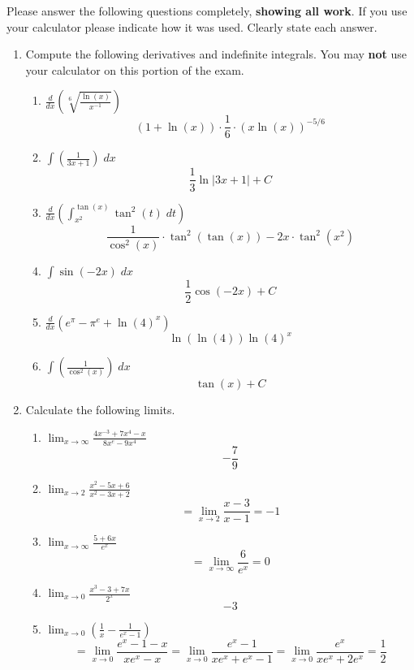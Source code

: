 \documentclass[11pt]{article}
\newcommand{\ds}{\displaystyle}
\begin{document}
\drawtitle

\noindent Please answer the following questions completely,
\textbf{showing all work}.  If you use your calculator please indicate
how it was used.  Clearly state each answer.

\begin{enumerate}
\item Compute the following derivatives and indefinite integrals.  You
  may \textbf{not} use your calculator on this portion of the exam.
  \begin{enumerate}
  \item $\ds\frac{d}{dx}\left(\sqrt[6]{\frac{\ln(x)}{x^{-1}}}\right)$
    \vfill
    \[
    (1+\ln(x))\cdot\frac{1}{6}\cdot (x\ln(x))^{-5/6}
    \]
    \vfill
  \item $\ds\int\left(\frac{1}{3x+1}\right)\;dx$
    \vfill
    \[
    \frac{1}{3}\ln|3x+1|+C
    \]
    \vfill
    \newpage
  \item $\ds\frac{d}{dx}\left(\int_{x^2}^{\tan(x)}\tan^2(t)\;dt\right)$
    \vfill
    \[
    \frac{1}{\cos^2(x)}\cdot\tan^2(\tan(x))-2x\cdot\tan^2(x^2)
    \]
    \vfill
  \item $\ds\int\sin\left(-2x\right)\;dx$
    \vfill
    \[
    \frac{1}{2}\cos(-2x)+C
    \]
    \vfill
    \newpage
  \item $\ds\frac{d}{dx}\left(e^{\pi}-\pi^e+\ln(4)^x\right)$
    \vfill
    \[
    \ln(\ln(4))\ln(4)^x
    \]
    \vfill
  \item $\ds\int\left(\frac{1}{\cos^2(x)}\right)\;dx$
    \vfill
    \[
    \tan(x)+C
    \]
    \vfill
  \end{enumerate}

  \newpage

\item Calculate the following limits.
  \begin{enumerate}
  \item $\ds\lim_{x\to \infty}\frac{4x^{-3}+7x^4-x}{8x^e-9x^4}$
    \vfill
    \[
    -\frac{7}{9}
    \]
    \vfill
  \item $\ds\lim_{x\to 2}\frac{x^2-5x+6}{x^2-3x+2}$
    \vfill
    \[
    =\lim_{x\to 2}\frac{x-3}{x-1}=-1
    \]
    \vfill
  \item $\ds\lim_{x\to \infty}\frac{5+6x}{e^x}$
    \vfill
    \[
    =\lim_{x\to\infty} \frac{6}{e^x}=0
    \]
    \vfill\newpage
  \item $\ds\lim_{x\to 0}\frac{x^3-3+7x}{2^x}$
    \vfill
    \[
    -3
    \]
    \vfill
  \item $\ds\lim_{x\to 0}\left(\frac{1}{x}-\frac{1}{e^x-1}\right)$
    \vfill
    \[
    =\lim_{x\to 0}\frac{e^x-1-x}{xe^x-x} =\lim_{x\to
      0}\frac{e^x-1}{xe^x+e^x-1} =\lim_{x\to
      0}\frac{e^x}{xe^x+2e^x}=\frac{1}{2}
    \]
    \vfill
  \end{enumerate}
  

\end{enumerate}
\end{document}

